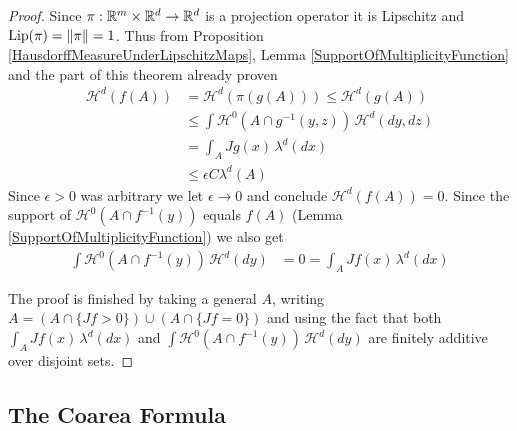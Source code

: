 \begin{proof}
Since $\pi : \mathbb{R}^m \times \mathbb{R}^d \to \mathbb{R}^d$ is a projection operator it is Lipschitz and $\operatorname*{Lip}(\pi) = \left \lVert \pi \right \rVert = 1$.  Thus from Proposition \ref{HausdorffMeasureUnderLipschitzMaps},
Lemma \ref{SupportOfMultiplicityFunction}
and the part of this theorem already proven
\begin{align*}
\mathcal{H}^d(f(A)) &= \mathcal{H}^d(\pi(g(A))) \leq \mathcal{H}^d(g(A)) \\
&\leq \int \mathcal{H}^0(A \cap g^{-1}(y,z)) \, \mathcal{H}^d(dy,dz) \\
&=\int_A Jg(x) \, \lambda^d(dx) \\
&\leq \epsilon C \lambda^d(A)
\end{align*}
Since $\epsilon>0$ was arbitrary we let $\epsilon \to 0$ and conclude $\mathcal{H}^d(f(A))=0$.  Since the support of $\mathcal{H}^0(A \cap f^{-1}(y))$ equals $f(A)$ (Lemma \ref{SupportOfMultiplicityFunction}) we also get
\begin{align*}
\int \mathcal{H}^0(A \cap f^{-1}(y)) \, \mathcal{H}^d(dy) &= 0 = \int_A Jf(x) \, \lambda^d(dx)
\end{align*}

The proof is finished by taking a general $A$, writing $A = (A \cap \lbrace Jf>0 \rbrace) \cup (A \cap \lbrace Jf = 0 \rbrace)$ and using the fact that both $\int_A Jf(x) \, \lambda^d(dx)$ and
$\int \mathcal{H}^0(A \cap f^{-1}(y)) \, \mathcal{H}^d(dy)$ are finitely additive over disjoint sets.
\end{proof}

\subsection{The Coarea Formula}

